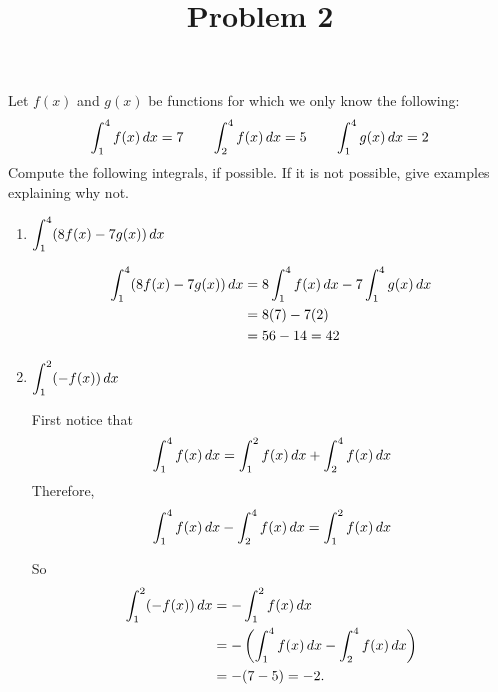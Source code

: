 \documentclass{ximera}
\title[Problem 2]{Problem 2}
\begin{document}
\begin{abstract} \end{abstract}
\maketitle


\begin{problem}
Let $f(x)$ and $g(x)$ be functions for which we only know the following:
$$ \displaystyle \int_1^4 f(x)\,d x = 7	\qquad	\displaystyle \int_2^4 f(x)\,d x = 5	\qquad	\displaystyle \int_1^4 g(x)\,d x = 2 $$
Compute the following integrals, if possible.  If it is not possible, give examples explaining why not.
	\begin{enumerate}
	
	\item  $\displaystyle \int_1^4 (8f(x) - 7g(x))\,d x $
		\begin{explanation}
			\begin{align*}
			\displaystyle \int_1^4 (8f(x) - 7g(x))\,d x &= 8 \displaystyle \int_1^4 f(x) \,d x - 7 \displaystyle \int_1^4 g(x) \,d x  \\
			&= 8(7) - 7(2) \\
			&= 56 - 14 = 42
			\end{align*}
		\end{explanation}
		
	\item  $\displaystyle \int_1^2 (-f(x)) \,d x $
		\begin{explanation}
		First notice that
			\begin{equation*}
			\displaystyle \int_1^4 f(x) \,d x = \displaystyle \int_1^2 f(x) \,d x + \displaystyle \int_2^4 f(x) \,d x
			\end{equation*}
			Therefore,
			\begin{equation*}
			\displaystyle \int_1^4 f(x) \,d x- \displaystyle \int_2^4 f(x) \,d x = \displaystyle \int_1^2 f(x) \,d x 
			\end{equation*}
			
		So
			\begin{align*}
			\displaystyle \int_1^2 (-f(x)) \,d x &= - \displaystyle \int_1^2 f(x) \,d x  \\
			&= - \left( \displaystyle \int_1^4 f(x)\,d x - \displaystyle \int_2^4 f(x)\,d x \right)  \\
			&= - (7 - 5) = -2.
			\end{align*}
			
		\end{explanation}
		

\end{enumerate}
\end{problem}
\end{document}
